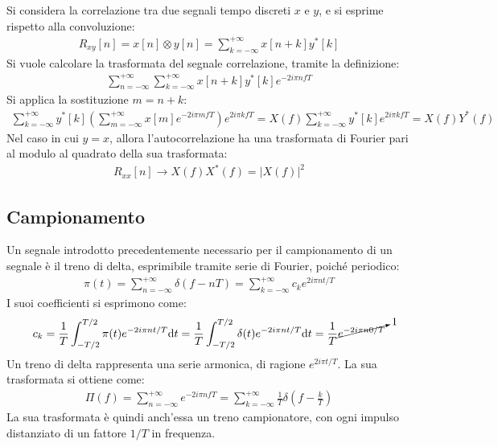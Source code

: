 \documentclass{article}
\newcommand{\df}{\mathrm{d}}
\numberwithin{equation}{subsection}
\begin{document}
Si considera la correlazione tra due segnali tempo discreti $x$ e $y$, e si esprime rispetto alla convoluzione:
\begin{gather*}
    R_{xy}[n]=x[n]\otimes y[n]=\displaystyle\sum_{k=-\infty}^{+\infty}x[n+k]y^*[k]
\end{gather*}
Si vuole calcolare la trasformata del segnale correlazione, tramite la definizione:
\begin{gather*}
    \displaystyle\sum_{n=-\infty}^{+\infty}\sum_{k=-\infty}^{+\infty}x[n+k]y^*[k]e^{-2i\pi nfT}
\end{gather*}
Si applica la sostituzione $m=n+k$:
\begin{gather*}
    \displaystyle\sum_{k=-\infty}^{+\infty}y^*[k]\left(\sum_{m=-\infty}^{+\infty}x[m]e^{-2i\pi mfT}\right)e^{2i\pi kfT}= X(f)\sum_{k=-\infty}^{+\infty}y^*[k]e^{2i\pi kfT}=X(f)Y^*(f)
\end{gather*}
Nel caso in cui $y=x$, allora l'autocorrelazione ha una trasformata di Fourier pari al modulo al quadrato della sua trasformata:
\begin{gather*}
    R_{xx}[n]\to X(f)X^*(f)=|X(f)|^2
\end{gather*}

\subsection{Campionamento}

Un segnale introdotto precedentemente necessario per il campionamento di un segnale è il treno di delta, esprimibile tramite serie di Fourier, poiché periodico:
\begin{gather*}
    \pi(t)=\displaystyle\sum_{n=-\infty}^{+\infty}\delta\left(f-nT\right)=\sum_{k=-\infty}^{+\infty}c_ke^{2i\pi nt/T}
\end{gather*}
I suoi coefficienti si esprimono come:
\begin{gather*}
    c_k=\displaystyle\frac{1}{T}\int_{-T/2}^{T/2}\pi(t)e^{-2i\pi nt/T}\df t=\frac{1}{T}\int_{-T/2}^{T/2}\delta(t)e^{-2i\pi nt/T}\df t=\frac{1}{T}\cancelto{1}{e^{-2i\pi n0/T}}
\end{gather*}
Un treno di delta rappresenta una serie armonica, di ragione $e^{2i\pi t/T}$. La sua trasformata si ottiene come:
\begin{gather*}
    \Pi(f)=\displaystyle\sum_{n=-\infty}^{+\infty}e^{-2i\pi nfT}=\sum_{k=-\infty}^{+\infty}\frac{1}{T}\delta\left(f-\frac{k}{T}\right)
\end{gather*}
La sua trasformata è quindi anch'essa un treno campionatore, con ogni impulso distanziato di un fattore $1/T$ in frequenza. 
\end{document}
